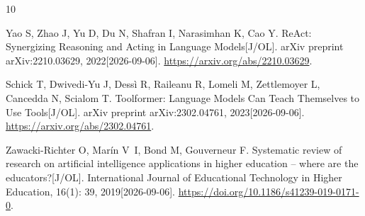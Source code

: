 \begin{thebibliography}{10}
\providecommand{\bibauthor}[1]{#1}
\providecommand{\bibeditor}[1]{#1}
\providecommand{\bibtranslator}[1]{#1}
\providecommand{\bibtitle}[1]{#1}
\providecommand{\bibbooktitle}[1]{#1}
\providecommand{\bibjournal}[1]{#1}
\providecommand{\bibmark}[1]{#1}
\providecommand{\bibcountry}[1]{#1}
\providecommand{\bibpatentid}[1]{#1}
\providecommand{\bibedition}[1]{#1}
\providecommand{\biborganization}[1]{#1}
\providecommand{\bibaddress}[1]{#1}
\providecommand{\bibpublisher}[1]{#1}
\providecommand{\bibinstitution}[1]{#1}
\providecommand{\bibschool}[1]{#1}
\providecommand{\bibvolume}[1]{#1}
\providecommand{\bibnumber}[1]{#1}
\providecommand{\bibversion}[1]{#1}
\providecommand{\bibpages}[1]{#1}
\providecommand{\bibmodifydate}[1]{#1}
\providecommand{\bibcitedate}[1]{#1}
\providecommand{\bibyear}[1]{#1}
\providecommand{\bibdate}[1]{#1}
\providecommand{\biburl}[1]{\newline\url{#1}}

\bibauthor{Yao S\@, Zhao J\@, Yu D\@, Du N\@, Shafran I\@, Narasimhan K\@, Cao
  Y}\@. \bibtitle{{ReAct: Synergizing Reasoning and Acting in Language
  Models}}\bibmark{[J/OL]}\@. \bibjournal{arXiv preprint arXiv:2210.03629}\@,
  \bibyear{2022}\bibcitedate{[2026-09-06]}\@.
  \url{https://arxiv.org/abs/2210.03629}\@.

\bibauthor{Schick T\@, Dwivedi-Yu J\@, Dessì R\@, Raileanu R\@, Lomeli M\@,
  Zettlemoyer L\@, Cancedda N\@, Scialom T}\@. \bibtitle{{Toolformer: Language
  Models Can Teach Themselves to Use Tools}}\bibmark{[J/OL]}\@.
  \bibjournal{arXiv preprint arXiv:2302.04761}\@,
  \bibyear{2023}\bibcitedate{[2026-09-06]}\@.
  \url{https://arxiv.org/abs/2302.04761}\@.

\bibauthor{Zawacki-Richter O\@, Marín V~I\@, Bond M\@, Gouverneur F}\@.
  \bibtitle{{Systematic review of research on artificial intelligence
  applications in higher education -- where are the
  educators?}}\bibmark{[J/OL]}\@. \bibjournal{International Journal of
  Educational Technology in Higher Education}\@,
  \bibvolume{16}\bibnumber{(1)}\thinspace{}\textnormal{: }\bibpages{39}\@,
  \bibyear{2019}\bibcitedate{[2026-09-06]}\@.
  \url{https://doi.org/10.1186/s41239-019-0171-0}\@.


\end{thebibliography}
